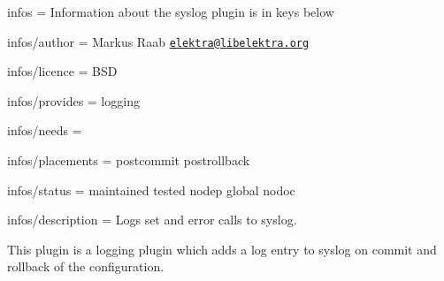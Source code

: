 
\begin{DoxyItemize}
\item infos = Information about the syslog plugin is in keys below
\item infos/author = Markus Raab \href{mailto:elektra@libelektra.org}{\tt elektra@libelektra.\+org}
\item infos/licence = B\+SD
\item infos/provides = logging
\item infos/needs =
\item infos/placements = postcommit postrollback
\item infos/status = maintained tested nodep global nodoc
\item infos/description = Logs set and error calls to syslog.
\end{DoxyItemize}

This plugin is a logging plugin which adds a log entry to syslog on commit and rollback of the configuration. 